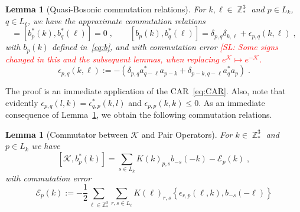 \documentclass[12pt,a4paper]{article}
\numberwithin{equation}{section}
\newcommand{\cK}{\mathcal{K}}
\newcommand{\1}{\mathbb{I}}
\DeclareMathOperator{\Z}{\mathbb{Z}}
\theoremstyle{plain}
\newtheorem{lemma}[theorem]{Lemma}
\theoremstyle{definition}
\theoremstyle{remark}
\theoremstyle{plain}
\theoremstyle{definition}
\theoremstyle{remark}
\begin{document}
\begin{lemma}[Quasi-Bosonic commutation relations]\label{lem:paircomm}
For $k,\ell \in \Z^3_*$ and $p \in L_{k}$, $q\in L_{\ell}$, we have the approximate commutation relations
\begin{equation}
       [b_{p}(k),b_{q}(\ell)] = [b^*_{p}(k),b^*_{q}(\ell)] = 0 \;, \qquad
       [b_{p}(k),b^*_{q}(\ell)] = \delta_{p,q}\delta_{k,\ell} + \epsilon_{p,q}(k,\ell) \;,
\end{equation}
with $ b_p(k) $ defined in~\eqref{eq:b}, and with commutation error \textcolor{red}{[SL: Some signs changed in this and the subsequent lemmas, when replacing $ e^{\cK} \mapsto e^{-\cK} $.}
\begin{equation}
	\epsilon_{p,q}(k,\ell)
	:= -\left(\delta_{p,q}a^*_{q-\ell}a_{p-k} + \delta_{p-k,q-\ell}a^*_{q}a_{p}\right) \;.
\end{equation}
\end{lemma}
The proof is an immediate application of the CAR~\eqref{eq:CAR}. Also, note that evidently $\epsilon_{p,q}(l,k) = \epsilon^*_{q,p}(k,l) $ and $\epsilon_{p,p}(k,k)\leq 0$. As an immediate consequence of Lemma~\ref{lem:paircomm}, we obtain the following commutation relations.

\begin{lemma}[Commutator between $\cK $ and Pair Operators]
For $k \in \Z^3_*$ and $p \in L_k$ we have
\begin{equation} \label{eq:comm_Kb}
	[\cK, b^*_p(k)]
	= \sum\limits_{s\in L_{k}}K(k)_{p,s}b_{-s}(-k)
		- \mathcal{E}_{p}(k) \;,
\end{equation}
with commutation error
\begin{equation}\label{eq:commerrKb}
    \mathcal{E}_{p}(k) := -\frac{1}{2}\sum\limits_{\ell\in \mathbb{Z}^3_*}\sum\limits_{r,s\in L_\ell}K(\ell)_{r,s}\left\{\epsilon_{r,p}(\ell,k),b_{-s}(-\ell)\right\} 
\end{equation}
\end{lemma}
\end{document}
